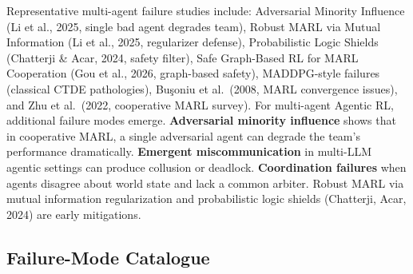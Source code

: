 \documentclass{article}
\begin{document}
Representative multi-agent failure studies include: Adversarial Minority Influence (Li et al., 2025, single bad agent degrades team), Robust MARL via Mutual Information (Li et al., 2025, regularizer defense), Probabilistic Logic Shields (Chatterji \& Acar, 2024, safety filter), Safe Graph-Based RL for MARL Cooperation (Gou et al., 2026, graph-based safety), MADDPG-style failures (classical CTDE pathologies), Buşoniu et al.~(2008, MARL convergence issues), and Zhu et al.~(2022, cooperative MARL survey). For multi-agent Agentic RL, additional failure modes emerge. \textbf{Adversarial minority influence} \citep{li2025aplanreusemechanis} shows that in cooperative MARL, a single adversarial agent can degrade the team's performance dramatically. \textbf{Emergent miscommunication} in multi-LLM agentic settings can produce collusion or deadlock. \textbf{Coordination failures} when agents disagree about world state and lack a common arbiter. Robust MARL via mutual information regularization \citep{li2025aplanreusemechanis} and probabilistic logic shields (Chatterji, Acar, 2024) are early mitigations.

\subsection{Failure-Mode Catalogue}\label{failure-mode-catalogue}
\end{document}
